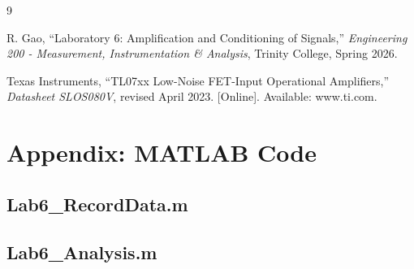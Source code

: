 \documentclass[11pt]{article}
\begin{document}
\newpage
\begin{thebibliography}{9}

  R. Gao, ``Laboratory 6: Amplification and Conditioning of Signals,'' \textit{Engineering 200 - Measurement, Instrumentation \& Analysis}, Trinity College, Spring 2026.

  Texas Instruments, ``TL07xx Low-Noise FET-Input Operational Amplifiers,'' \textit{Datasheet SLOS080V}, revised April 2023. [Online]. Available: www.ti.com.

\end{thebibliography}

\newpage
\appendix
\section*{Appendix: MATLAB Code}

\subsection*{Lab6\_RecordData.m}


\subsection*{Lab6\_Analysis.m}

\end{document}

